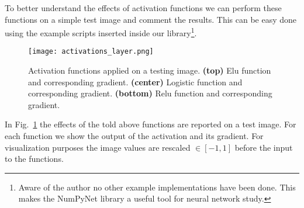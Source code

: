 \documentclass{standalone}
\begin{document}
To better understand the effects of activation functions we can perform these functions on a simple test image and comment the results.
This can be easy done using the example scripts inserted inside our library\footnote{
  Aware of the author no other example implementations have been done.
  This makes the NumPyNet library a useful tool for neural network study.
}.

\begin{center}
\begin{figure}[htbp]
\centering
\texttt{[image: activations\_layer.png]}
\caption{Activation functions applied on a testing image.
\textbf{(top)} Elu function and corresponding gradient.
\textbf{(center)} Logistic function and corresponding gradient.
\textbf{(bottom)} Relu function and corresponding gradient.
}
\label{fig:activations}
\end{figure}
\end{center}

In Fig.~\ref{fig:activations} the effects of the told above functions are reported on a test image.
For each function we show the output of the activation and its gradient.
For visualization purposes the image values are rescaled $\in[-1, 1]$ before the input to the functions.




\end{document}
